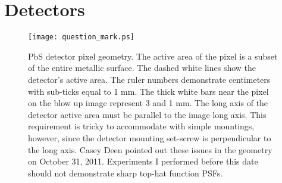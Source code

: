 \section{Detectors}



\begin{figure}
\begin{center}
    \texttt{[image: question\_mark.ps]}
  \end{center}
  \caption[PbS detector pixel geometry]{PbS detector pixel geometry.  The active area of the pixel is a subset of the entire metallic surface.  The dashed white lines show the detector's active area.  The ruler numbers demonstrate centimeters with sub-ticks equal to 1 mm.  The thick white bars near the pixel on the blow up image represent 3 and 1 mm.  The long axis of the detector active area must be parallel to the image long axis.  This requirement is tricky to accommodate with simple mountings, however, since the detector mounting set-screw is perpendicular to the long axis.  Casey Deen pointed out these issues in the geometry on October 31, 2011.  Experiments I performed before this date should not demonstrate sharp top-hat function PSFs.}
\end{figure}


